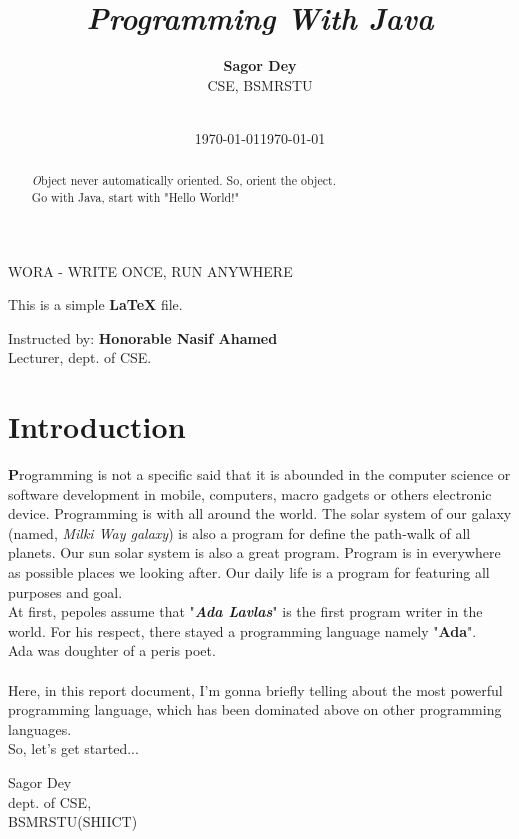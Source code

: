 \documentclass[paper = A5, headinclude, parskip = full, oneside, font = 11 pt]{report}
\title{\textit{\textbf{\emph{P}}rogramming \textbf{\emph{W}}ith \textbf{\emph{J}}ava}}
\author
 {
 	\textbf{Sagor Dey}
 	\\
 	CSE, BSMRSTU
 	\\
 	\\
 	 }
\date{\today}
\begin{document}
\pagecolor{green}

\maketitle
\frenchspacing
{}
\pagestyle{plain}

\pagecolor{white}

\begin{abstract}
\color{blue}
\emph{O}bject never automatically oriented. So, orient the object.\\
Go with Java, start with "Hello World!"
\color{black}
\end{abstract}

\newpage

\pagecolor{black!89}

\begin{center}
 \color{violet}
  WORA - WRITE ONCE, RUN ANYWHERE
 \color{black}
 
 \begin{huge}
 \color{white}
  This is a simple \textbf{\LaTeX{}} file.
 \end{huge}
\end{center}

\begin{center}
\color{brown}
{\LARGE Instructed by: \textbf{Honorable Nasif Ahamed}\\Lecturer, dept. of CSE.}
\end{center}

\newpage

\pagecolor{white}

\color{black}
\section*{Introduction}
\textbf{P}rogramming is not a specific said that it is abounded in the computer science or software development in mobile, computers, macro gadgets or others electronic device. Programming is with all around the world. The solar system of our galaxy (named, \textit{Milki Way galaxy}) is also a program for define the path-walk of all planets. Our sun solar system is also a great program. Program is in everywhere as possible places we looking after. Our daily life is a program for featuring all purposes and goal.
\\

At first, pepoles assume that "\textbf{\textit{Ada Lavlas}}" is the first program writer in the world. For his respect, there stayed a programming language namely "\textbf{Ada}".
\\
Ada was doughter of a peris poet.
\\
\\
Here, in this report document, I'm gonna briefly telling about the most powerful programming language, which has been dominated above on other programming languages.
\\
So, let's get started...
\begin{flushright}
 Sagor Dey
 \\
 dept. of CSE,\\BSMRSTU(SHIICT)
 \\
 \date{\today}
\end{flushright}
\end{document}
